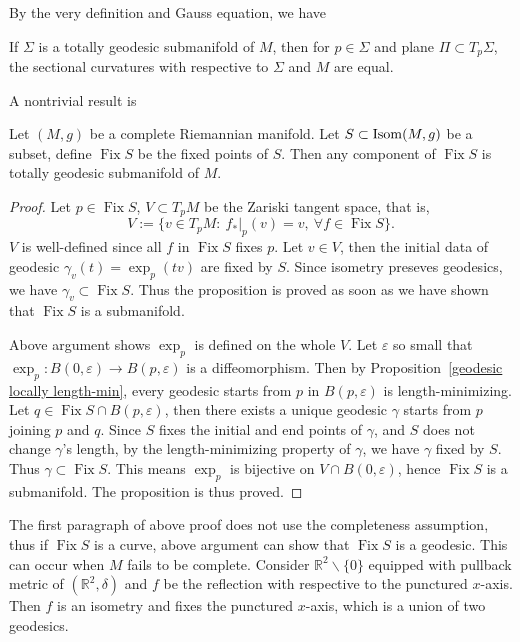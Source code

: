 By the very definition and Gauss equation, we have
\begin{lem}
    If $\Sigma$ is a totally geodesic submanifold of $M$, then for $p\in\Sigma$ and plane $\Pi\subset T_p\Sigma$, the sectional curvatures with respective to $\Sigma$ and $M$ are equal.
\end{lem}

A nontrivial result is
\begin{prop}\label{Fix S totally geodesic}
    Let $(M,g)$ be a complete Riemannian manifold.
    Let $S\subset\operatorname{Isom}(M,g)$ be a subset, define $\operatorname{Fix}{S}$ be the fixed points of $S$.
    Then any component of $\operatorname{Fix}{S}$ is totally geodesic submanifold of $M$.
\end{prop}
\begin{proof}
    Let $p\in\operatorname{Fix}{S}$, $V\subset T_pM$ be the Zariski tangent space, that is,
    \[V:=\{v\in T_pM:\ f_*|_p(v)=v,\ \forall f\in\operatorname{Fix}{S}\}.\]
    $V$ is well-defined since all $f$ in $\operatorname{Fix}{S}$ fixes $p$.
    Let $v\in V$, then the initial data of geodesic $\gamma_v(t)=\exp_p(tv)$ are fixed by $S$.
    Since isometry preseves geodesics, we have $\gamma_v\subset\operatorname{Fix}{S}$.
    Thus the proposition is proved as soon as we have shown that $\operatorname{Fix}{S}$ is a submanifold.

    Above argument shows $\exp_p$ is defined on the whole $V$.
    Let $\varepsilon$ so small that $\exp_p:B(0,\varepsilon)\to B(p,\varepsilon)$ is a diffeomorphism.
    Then by Proposition~\ref{geodesic locally length-min}, every geodesic starts from $p$ in $B(p,\varepsilon)$ is length-minimizing.
    Let $q\in\operatorname{Fix}{S}\cap B(p,\varepsilon)$, then there exists a unique geodesic $\gamma$ starts from $p$ joining $p$ and $q$.
    Since $S$ fixes the initial and end points of $\gamma$, and $S$ does not change $\gamma$'s length, by the length-minimizing property of $\gamma$, we have $\gamma$ fixed by $S$.
    Thus $\gamma\subset\operatorname{Fix}{S}$.
    This means $\exp_p$ is bijective on $V\cap B(0,\varepsilon)$, hence $\operatorname{Fix}{S}$ is a submanifold.
    The proposition is thus proved. 
\end{proof}
\begin{rem}
    The first paragraph of above proof does not use the completeness assumption, thus if $\operatorname{Fix}{S}$ is a curve, above argument can show that $\operatorname{Fix}{S}$ is a geodesic.
    This can occur when $M$ fails to be complete.
    Consider $\mathbb{R}^2\backslash\{0\}$ equipped with pullback metric of $(\mathbb{R}^2,\delta)$ and $f$ be the reflection with respective to the punctured $x$-axis.
    Then $f$ is an isometry and fixes the punctured $x$-axis, which is a union of two geodesics.
\end{rem}

